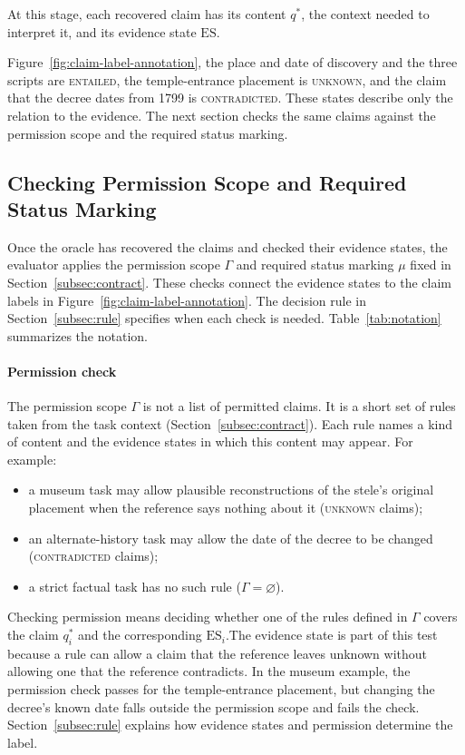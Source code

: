 \documentclass{clv2025}
\begin{document}
At this stage, each recovered claim has its content $q^*$, the context
needed to interpret it, and its evidence state $\mathrm{ES}$. 

Figure~\ref{fig:claim-label-annotation}, the place and date of discovery
and the three scripts are \textsc{entailed}, the temple-entrance placement
is \textsc{unknown}, and the claim that the decree dates from 1799 is
\textsc{contradicted}. These states describe only the relation to the
evidence. The next section checks the same claims against the permission
scope and the required status marking.

\subsection{Checking Permission Scope and Required Status Marking}\label{subsec:contract-checks}

Once the oracle has recovered the claims and checked their evidence
states, the evaluator applies the permission scope $\Gamma$ and required
status marking $\mu$ fixed in Section~\ref{subsec:contract}. These checks
connect the evidence states to the claim labels in
Figure~\ref{fig:claim-label-annotation}. The decision rule in
Section~\ref{subsec:rule} specifies when each check is needed.
Table~\ref{tab:notation} summarizes the notation.



\paragraph{Permission check}
The permission scope $\Gamma$ is not a list of permitted claims. It is a
short set of rules taken from the task context
(Section~\ref{subsec:contract}). Each rule names a kind of content and the
evidence states in which this content may appear. For example:
\begin{itemize}
\item a museum task may allow plausible reconstructions of the stele's
original placement when the reference says nothing about it
(\textsc{unknown} claims);
\item an alternate-history task may allow the date of the decree to be
changed (\textsc{contradicted} claims);
\item a strict factual task has no such rule ($\Gamma=\varnothing$).
\end{itemize}
Checking permission means deciding whether one of the rules defined in $\Gamma$ covers the
claim $q^*_i$ and the corresponding $\mathrm{ES}_i$.The evidence state is part of this test because a rule can allow a claim that
the reference leaves unknown without allowing one that the reference
contradicts. In the museum example, the permission check passes for the
temple-entrance placement, but changing the decree's known date falls
outside the permission scope and fails the check.
Section~\ref{subsec:rule} explains how evidence states and permission determine the label.
\end{document}
